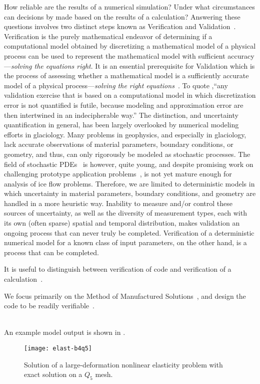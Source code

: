 How reliable are the results of a numerical simulation?
Under what circumstances can decisions by made based on the results of a calculation?
Answering these questions involves two distinct steps known as Verification and Validation~\cite{babuska2004vav,roache1998verification}.
Verification is the purely mathematical endeavor of determining if a computational model obtained by discretizing a mathematical model of a physical process can be used to represent the mathematical model with sufficient accuracy---\emph{solving the equations right}.
It is an essential prerequisite for Validation which is the process of assessing whether a mathematical model is a sufficiently accurate model of a physical process---\emph{solving the right equations}~\cite{roache1998verification}.
To quote \cite{babuska2004vav},``any validation exercise that is based on a computational model in which discretization error is not quantified is futile, because modeling and approximation error are then intertwined in an indecipherable way.''
The distinction, and uncertainty quantification in general, has been largely overlooked by numerical modeling efforts in glaciology.
Many problems in geophysics, and especially in glaciology, lack accurate observations of material parameters, boundary conditions, or geometry, and thus, can only rigorously be modeled as stochastic processes.
The field of stochastic PDEs~\cite{deb2001ssp,ghanem2003sfe,chow2007stochastic} is however, quite young, and despite promising work on challenging prototype application problems~\cite{asokan2006stochastic,ganapathysubramanian2007sgc,zabaras2008scalable,mishra2011mlmcfvm}, is not yet mature enough for analysis of ice flow problems.
Therefore, we are limited to deterministic models in which uncertainty in material parameters, boundary conditions, and geometry are handled in a more heuristic way.
Inability to measure and/or control these sources of uncertainty, as well as the diversity of measurement types, each with its own (often sparse) spatial and temporal distribution, makes validation an ongoing process that can never truly be completed.
Verification of a deterministic numerical model for a known class of input parameters, on the other hand, is a process that can be completed.

It is useful to distinguish between verification of code and verification of a calculation~\cite{roache2002cvm}.

We focus primarily on the Method of Manufactured Solutions~\cite{roache2002cvm}, and design the code to be readily verifiable~\cite{roache2004bpc}.

\cite{salari2000code,knupp2002verification} \\

An example model output is shown in .

\begin{figure}
  \centering\texttt{[image: elast-b4q5]}
  \caption{Solution of a large-deformation nonlinear elasticity problem with exact solution on a $Q_5$ mesh.}\label{fig:elastexact}
\end{figure}
